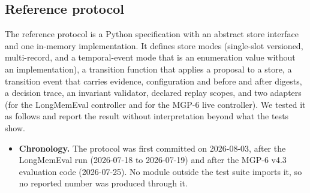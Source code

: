\subsection{Reference protocol}
The reference protocol is a Python specification with an abstract store interface and one in-memory implementation. It defines store modes (single-slot versioned, multi-record, and a temporal-event mode that is an enumeration value without an implementation), a transition function that applies a proposal to a store, a transition event that carries evidence, configuration and before and after digests, a decision trace, an invariant validator, declared replay scopes, and two adapters (for the LongMemEval controller and for the MGP-6 live controller). We tested it as follows and report the result without interpretation beyond what the tests show.
\begin{itemize}
\item \textbf{Chronology.} The protocol was first committed on 2026-08-03, after the LongMemEval run (2026-07-18 to 2026-07-19) and after the MGP-6 v4.3 evaluation code (2026-07-25). No module outside the test suite imports it, so no reported number was produced through it.

\end{itemize}
